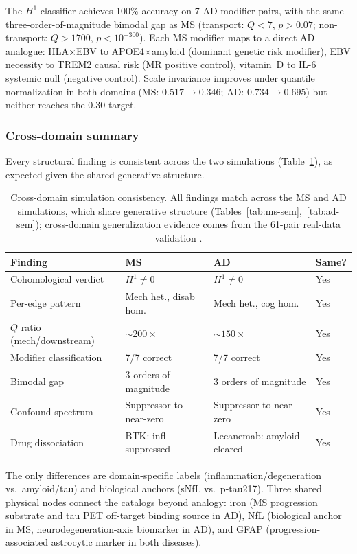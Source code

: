 \documentclass[11pt]{article}
\begin{document}
The $H^1$ classifier achieves 100\% accuracy on 7 AD modifier pairs, with the same three-order-of-magnitude bimodal gap as MS (transport: $Q < 7$, $p > 0.07$; non-transport: $Q > 1700$, $p < 10^{-300}$).
Each MS modifier maps to a direct AD analogue: HLA$\times$EBV to APOE4$\times$amyloid (dominant genetic risk modifier), EBV necessity to TREM2 causal risk (MR positive control), vitamin~D to IL-6 systemic null (negative control).
Scale invariance improves under quantile normalization in both domains (MS: $0.517 \to 0.346$; AD: $0.734 \to 0.695$) but neither reaches the $0.30$ target.

\subsubsection{Cross-domain summary}

Every structural finding is consistent across the two simulations (Table~\ref{tab:cross-summary}), as expected given the shared generative structure.

\begin{table}[t]
\centering
\caption{Cross-domain simulation consistency. All findings match across the MS and AD simulations, which share generative structure (Tables~\ref{tab:ms-sem},~\ref{tab:ad-sem}); cross-domain generalization evidence comes from the 61-pair real-data validation \citep{tower2026sheaf}.}
\label{tab:cross-summary}
\small
\begin{tabular}{@{}llll@{}}
\toprule
\textbf{Finding} & \textbf{MS} & \textbf{AD} & \textbf{Same?} \\
\midrule
Cohomological verdict & $H^1 \neq 0$ & $H^1 \neq 0$ & Yes \\
Per-edge pattern & Mech het., disab hom. & Mech het., cog hom. & Yes \\
$Q$ ratio (mech/downstream) & $\sim\!200\times$ & $\sim\!150\times$ & Yes \\
Modifier classification & 7/7 correct & 7/7 correct & Yes \\
Bimodal gap & 3 orders of magnitude & 3 orders of magnitude & Yes \\
Confound spectrum & Suppressor to near-zero & Suppressor to near-zero & Yes \\
Drug dissociation & BTK: infl suppressed & Lecanemab: amyloid cleared & Yes \\
\bottomrule
\end{tabular}
\end{table}

The only differences are domain-specific labels (inflammation/degeneration vs.\ amyloid/tau) and biological anchors (sNfL vs.\ p-tau217).
Three shared physical nodes connect the catalogs beyond analogy: iron (MS progression substrate and tau PET off-target binding source in AD), NfL (biological anchor in MS, neurodegeneration-axis biomarker in AD), and GFAP (progression-associated astrocytic marker in both diseases).
\end{document}
